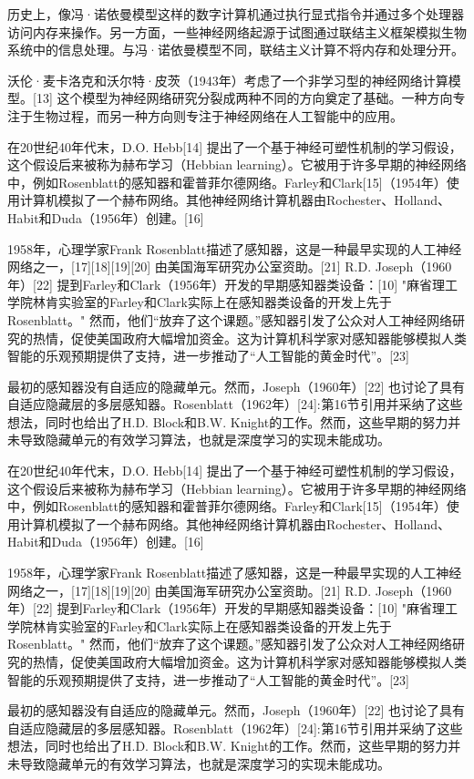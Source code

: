 历史上，像冯·诺依曼模型这样的数字计算机通过执行显式指令并通过多个处理器访问内存来操作。另一方面，一些神经网络起源于试图通过联结主义框架模拟生物系统中的信息处理。与冯·诺依曼模型不同，联结主义计算不将内存和处理分开。  

沃伦·麦卡洛克和沃尔特·皮茨（1943年）考虑了一个非学习型的神经网络计算模型。[13] 这个模型为神经网络研究分裂成两种不同的方向奠定了基础。一种方向专注于生物过程，而另一种方向则专注于神经网络在人工智能中的应用。

在20世纪40年代末，D.O. Hebb[14] 提出了一个基于神经可塑性机制的学习假设，这个假设后来被称为赫布学习（Hebbian learning）。它被用于许多早期的神经网络中，例如Rosenblatt的感知器和霍普菲尔德网络。Farley和Clark[15]（1954年）使用计算机模拟了一个赫布网络。其他神经网络计算机器由Rochester、Holland、Habit和Duda（1956年）创建。[16]  

1958年，心理学家Frank Rosenblatt描述了感知器，这是一种最早实现的人工神经网络之一，[17][18][19][20] 由美国海军研究办公室资助。[21] R.D. Joseph（1960年）[22] 提到Farley和Clark（1956年）开发的早期感知器类设备：[10] "麻省理工学院林肯实验室的Farley和Clark实际上在感知器类设备的开发上先于Rosenblatt。" 然而，他们“放弃了这个课题。”感知器引发了公众对人工神经网络研究的热情，促使美国政府大幅增加资金。这为计算机科学家对感知器能够模拟人类智能的乐观预期提供了支持，进一步推动了“人工智能的黄金时代”。[23]  

最初的感知器没有自适应的隐藏单元。然而，Joseph（1960年）[22] 也讨论了具有自适应隐藏层的多层感知器。Rosenblatt（1962年）[24]: 第16节 引用并采纳了这些想法，同时也给出了H.D. Block和B.W. Knight的工作。然而，这些早期的努力并未导致隐藏单元的有效学习算法，也就是深度学习的实现未能成功。

在20世纪40年代末，D.O. Hebb[14] 提出了一个基于神经可塑性机制的学习假设，这个假设后来被称为赫布学习（Hebbian learning）。它被用于许多早期的神经网络中，例如Rosenblatt的感知器和霍普菲尔德网络。Farley和Clark[15]（1954年）使用计算机模拟了一个赫布网络。其他神经网络计算机器由Rochester、Holland、Habit和Duda（1956年）创建。[16]  

1958年，心理学家Frank Rosenblatt描述了感知器，这是一种最早实现的人工神经网络之一，[17][18][19][20] 由美国海军研究办公室资助。[21] R.D. Joseph（1960年）[22] 提到Farley和Clark（1956年）开发的早期感知器类设备：[10] "麻省理工学院林肯实验室的Farley和Clark实际上在感知器类设备的开发上先于Rosenblatt。" 然而，他们“放弃了这个课题。”感知器引发了公众对人工神经网络研究的热情，促使美国政府大幅增加资金。这为计算机科学家对感知器能够模拟人类智能的乐观预期提供了支持，进一步推动了“人工智能的黄金时代”。[23]  

最初的感知器没有自适应的隐藏单元。然而，Joseph（1960年）[22] 也讨论了具有自适应隐藏层的多层感知器。Rosenblatt（1962年）[24]: 第16节 引用并采纳了这些想法，同时也给出了H.D. Block和B.W. Knight的工作。然而，这些早期的努力并未导致隐藏单元的有效学习算法，也就是深度学习的实现未能成功。